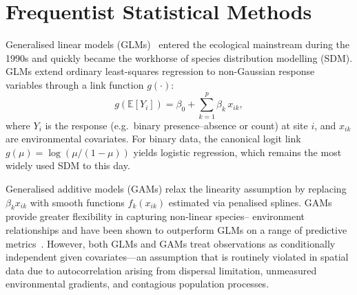 \section{Frequentist Statistical Methods}

Generalised linear models (GLMs)~\cite{elith2009} entered the ecological
mainstream during the 1990s and quickly became the workhorse of species
distribution modelling (SDM). GLMs extend ordinary least-squares regression
to non-Gaussian response variables through a link function $g(\cdot)$:
\begin{equation}\label{eq:glm}
  g(\mathbb{E}[Y_i]) = \beta_0 + \sum_{k=1}^{p} \beta_k\, x_{ik},
\end{equation}
where $Y_i$ is the response (e.g.\ binary presence--absence or count) at site
$i$, and $x_{ik}$ are environmental covariates. For binary data, the canonical
logit link $g(\mu) = \log(\mu/(1-\mu))$ yields logistic regression, which
remains the most widely used SDM to this day.

Generalised additive models (GAMs) relax the linearity assumption by replacing
$\beta_k x_{ik}$ with smooth functions $f_k(x_{ik})$ estimated via penalised
splines. GAMs provide greater flexibility in capturing non-linear species--
environment relationships and have been shown to outperform GLMs on a range of
predictive metrics~\cite{elith2009}. However, both GLMs and GAMs treat
observations as conditionally independent given covariates—an assumption that
is routinely violated in spatial data due to autocorrelation arising from
dispersal limitation, unmeasured environmental gradients, and contagious
population processes.

